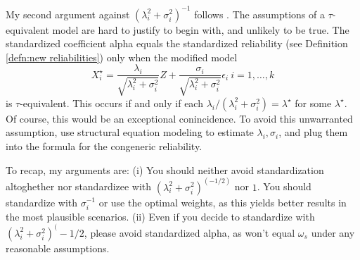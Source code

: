 \documentclass{article}
\theoremstyle{plain}
\theoremstyle{plain}
\theoremstyle{definition}
\theoremstyle{remark}
\theoremstyle{definition}
\theoremstyle{plain}
\theoremstyle{plain}
\theoremstyle{definition}
\begin{document}
My second argument against $(\lambda_{i}^{2}+\sigma_{i}^{2})^{-1}$
follows \citep{Falk2011-ae}. The assumptions of a $\tau$-equivalent model are hard
to justify to begin with, and unlikely to be true. The standardized
coefficient alpha equals the standardized reliability (see Definition \ref{defn:new reliabilities}) only when the modified model
\[
X_{i}^{\star}=\frac{\lambda_{i}}{\sqrt{\lambda_{i}^{2}+\sigma_{i}^{2}}}Z+\frac{\sigma_{i}}{\sqrt{\lambda_{i}^{2}+\sigma_{i}^{2}}}\epsilon_{i}\:i=1,\ldots,k
\]
is $\tau$-equivalent. This occurs if and only if each $\lambda_{i}/(\lambda_{i}^{2}+\sigma_{i}^{2})=\lambda^{\star}$
for some $\lambda^{\star}$. Of course, this would be an exceptional
conincidence. To avoid this unwarranted assumption, use structural equation
modeling to estimate $\lambda_{i},\sigma_{i}$, and plug them into
the formula for the congeneric reliability.

To recap, my arguments are: (i) You should neither avoid standardization altoghether nor standardizee with $(\lambda_{i}^{2}+\sigma_{i}^{2})^(-1/2)$ nor $1$. You should standardize with $\sigma_i^{-1}$ or use the optimal weights, as this yields better results in the most plausible scenarios. (ii) Even if you decide to standardize with $(\lambda_{i}^{2}+\sigma_{i}^{2})^(-1/2$, please avoid standardized alpha, as won't equal $\omega_s$ under any reasonable assumptions.


\end{document}
